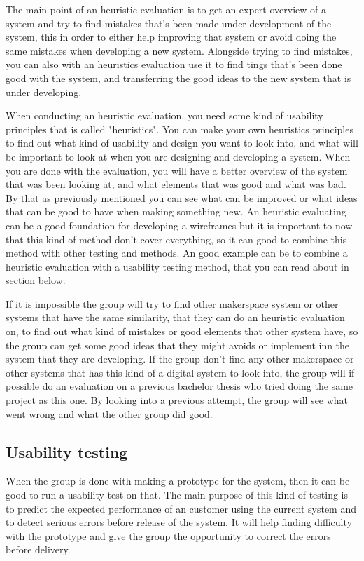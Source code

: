 The main point of an heuristic evaluation is to get an expert overview of a system and try to find mistakes that's been made 
under development of the system, this in order to either help improving that system or avoid doing the same mistakes when developing a new system. Alongside trying to find mistakes, you can also with an heuristics evaluation use it to find tings that's been done good with the system, and transferring the good ideas to the new system that is under developing. 

When conducting an heuristic evaluation, you need some kind of usability principles that is called "heuristics"\cite{heuristic-evaluation}. You can make your own heuristics principles to find out what kind of usability and design you want to look into, and what will be important to look at when you are designing and developing a system. When you are done with the evaluation, you will have a better overview of the system that was been looking at, and what elements that was good and what was bad. By that as previously mentioned you can see what can be improved or what ideas that can be good to have when making something new. An heuristic evaluating can be a good foundation for developing a wireframes but it is important to now that this kind of method don't cover everything, so it can good to combine this method with other testing and methods.\cite{heuristic-evaluation} An good example can be to combine a heuristic evaluation with a usability testing method, that you can read about in section below.

If it is impossible the group will try to find other makerspace system or other systems that have the same similarity, that they can do an heuristic evaluation on, to find out what kind of mistakes or good elements that other system have, so the group can get some good ideas that they might avoids or implement inn the system that they are developing. If the group don't find any other makerspace or other systems that has this kind of a digital system to look into, the group will if possible do an evaluation on a previous bachelor thesis who tried doing the same project as this one. By looking into a previous attempt, the group will see what went wrong and what the other group did good.\cite{heuristic-evaluation}

\subsection{Usability testing}
When the group is done with making a prototype for the system, then it can be 
good to run a usability test on that. The main purpose of this kind of testing is to predict the expected performance of an customer using the current system and to detect serious errors before release of the system.\cite{usability-testing}%
It will help finding difficulty with the prototype and give the group the opportunity to correct the errors before delivery.   

